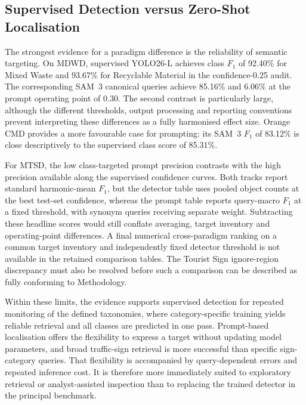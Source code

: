 
\subsection{Supervised Detection versus Zero-Shot Localisation}
\label{sec:ev-paradigms}
The strongest evidence for a paradigm difference is the reliability of semantic targeting. On \gls{MDWD}, supervised YOLO26-L achieves class \(F_1\) of 92.40\% for Mixed Waste and 93.67\% for Recyclable Material in the confidence-0.25 audit. The corresponding SAM~3 canonical queries achieve 85.16\% and 6.06\% at the prompt operating point of 0.30. The second contrast is particularly large, although the different thresholds, output processing and reporting conventions prevent interpreting these differences as a fully harmonised effect size. Orange CMD provides a more favourable case for prompting: its SAM~3 \(F_1\) of 83.12\% is close descriptively to the supervised class score of 85.31\%.

For \gls{MTSD}, the low class-targeted prompt precision contrasts with the high precision available along the supervised confidence curves. Both tracks report standard harmonic-mean \(F_1\), but the detector table uses pooled object counts at the best test-set confidence, whereas the prompt table reports query-macro \(F_1\) at a fixed threshold, with synonym queries receiving separate weight. Subtracting these headline scores would still conflate averaging, target inventory and operating-point differences. A final numerical cross-paradigm ranking on a common target inventory and independently fixed detector threshold is not available in the retained comparison tables. The Tourist Sign ignore-region discrepancy must also be resolved before such a comparison can be described as fully conforming to Methodology.

Within these limits, the evidence supports supervised detection for repeated monitoring of the defined taxonomies, where category-specific training yields reliable retrieval and all classes are predicted in one pass. Prompt-based localisation offers the flexibility to express a target without updating model parameters, and broad traffic-sign retrieval is more successful than specific sign-category queries. That flexibility is accompanied by query-dependent errors and repeated inference cost. It is therefore more immediately suited to exploratory retrieval or analyst-assisted inspection than to replacing the trained detector in the principal benchmark.

